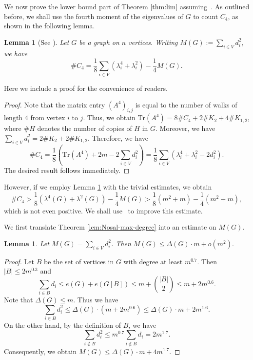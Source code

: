 \documentclass[11pt,a4paper]{article}
\newtheorem{lemma}[theorem]{Lemma}
\theoremstyle{definition}
\theoremstyle{remark}
\newcommand*{\abs}[1]{\lvert#1\rvert}
\begin{document}
We now prove the lower bound part of Theorem \ref{thm:lim} assuming~. As outlined before, we shall use the fourth moment of the eigenvalues of $G$ to count $C_4$, as shown in the following lemma.
\begin{lemma}[See \cite{LL2009}] 
\label{lem:LL-counting}
Let $G$ be a graph on $n$ vertices. Writing $M(G):= \sum_{i \in V} d_i^2$, we have 
\[ \# C_4 = \frac{1}{8}\sum_{i\in V}  (\lambda_i^4 +\lambda_i^2)
       - \frac{1}{4} M(G). \]
\end{lemma}

Here we include a proof for the convenience of readers. 

\begin{proof}
Note that the matrix entry $(A^4)_{i,j}$ is equal to the number of walks of length $4$ from vertex $i$ 
to $j$. Thus, we obtain $\mathrm{Tr}(A^4)=8\# C_4 + 
2\# K_2 + 4 \#K_{1,2}$, where $\# H$ denotes the number of copies of $H$ in $G$. Moreover, we have 
$\sum_{i\in V} d_i^2 = 2 \# K_2 + 2 \#K_{1,2}$. 
Therefore, we have 
\[ \# C_4= \frac{1}{8} \left(  \mathrm{Tr}(A^4) +2m - 
2 \sum_{i\in V} d_i^2 \right) 
= \frac{1}{8} \sum_{i\in V} (\lambda_i^4 + \lambda_i^2 - 2 d_i^2). \] 
The desired result follows immediately. 
\end{proof}
However, if we employ Lemma \ref{lem:LL-counting} with the trivial estimates, we obtain
\begin{equation}\label{eq:trace-not-enough}
  \#C_4 > \frac{1}{8}\left(\lambda^4(G) + \lambda^2(G) \right)
       - \frac{1}{4} M(G) > \frac{1}{8}(m^2 + m)
       - \frac{1}{4} (m^2 + m),   
\end{equation}
which is not even positive. We shall use~ to improve this estimate.

We first translate Theorem \ref{lem:Nosal-max-degree} into an estimate on $M(G)$.

\begin{lemma}
\label{lem:MG}
Let $M(G) = \sum_{i \in V} d_i^2$. Then $ M(G) \leq \Delta(G) \cdot m + o(m^2).$
\end{lemma}

\begin{proof}
    Let $B$ be the set of vertices in $G$ with degree at least $m^{0.7}$. Then $\abs{B} \leq 2m^{0.3}$ and 
    $$\sum_{i \in B} d_i \le e(G)+e(G[B])\le m + \binom{\abs{B}}{2} \leq m + 2m^{0.6}.$$
    Note that $\Delta (G)\le m$. Thus we have
    $$\sum_{i \in B} d_i^2 \leq \Delta(G) 
    \cdot (m + 2m^{0.6} ) \leq \Delta(G) \cdot m + 2m^{1.6}.$$
    On the other hand, by the definition of $B$, we have  
    $$\sum_{i \notin B} d_i^2 \leq m^{0.7} \sum_{i \notin B} d_i = 2m^{1.7}.$$
    Consequently, we obtain 
    $M(G)\le \Delta (G)\cdot m + 4m^{1.7}$. 
\end{proof}
\end{document}
